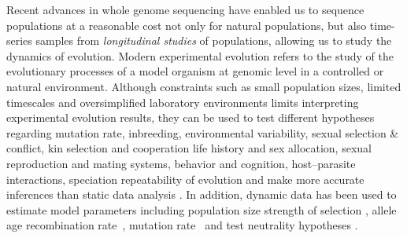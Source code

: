 \documentclass[11pt]{article}
\begin{document}
Recent advances in whole genome sequencing have enabled us to sequence
populations at a reasonable cost not only for natural populations, but
also time-series samples from \emph{longitudinal studies} of
populations, allowing us to study the dynamics of evolution. Modern
experimental evolution refers to the study of the evolutionary
processes of a model organism at genomic level in a controlled
\cite{hegreness2006equivalence,lang2013pervasive,orozco2012adaptation,
  lang2011genetic,barrick2009genome,bollback2007clonal,oz2014strength}
or natural
\cite{maldarelli2013hiv,reid2011new,denef2012situ,winters2012development,
  daniels2013genetic,barrett2008natural,bergland2014genomic}
environment.  Although constraints such as small population sizes,
limited timescales and oversimplified laboratory environments limits
interpreting experimental evolution results, they can be used to test
different hypotheses~\cite{kawecki2012experimental} regarding mutation
rate, inbreeding, environmental variability, sexual selection \&
conflict, kin selection and cooperation life history and sex
allocation, sexual reproduction and mating systems, behavior and
cognition, host–parasite interactions, speciation repeatability of
evolution and make more accurate inferences than static data analysis
\cite{boyko2008assessing,desai2008polymorphism,sawyer1992population}. In
addition, dynamic data has been used to estimate model parameters
including population size
\cite{williamson1999using,wang2001pseudo,pollak1983new,waples1989generalized,
  Terhorst2015Multi} strength of selection
\cite{mathieson2013estimating,illingworth2011distinguishing,Terhorst2015Multi,
  bollback2008estimation,illingworth2012quantifying,malaspinas2012estimating,
  Steinrücken2014a}, allele age \cite{malaspinas2012estimating}
recombination rate~\cite{Terhorst2015Multi}, mutation
rate~\cite{Barrick2013Genome, Terhorst2015Multi} and test neutrality
hypotheses
\cite{feder2014Identifying,Terhorst2015Multi,burke2010genome,bergland2014genomic}.
\end{document}
